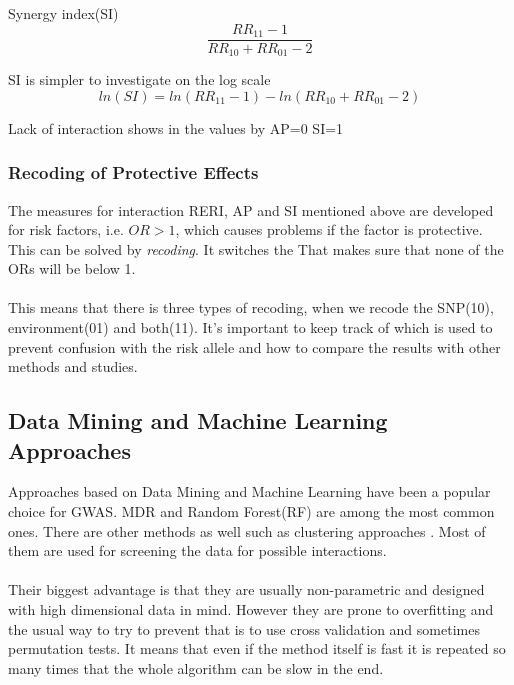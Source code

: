 \documentclass[10pt,a4paper]{report}
\begin{document}
Synergy index(SI)
\begin{equation}
\frac{RR_{11}-1}{RR_{10}+RR_{01}-2}
\end{equation}

SI is simpler to investigate on the log scale
\begin{equation}
ln(SI)=ln(RR_{11}-1)-ln(RR_{10}+RR_{01}-2)
\end{equation}

Lack of interaction shows in the values by
AP=0
SI=1
\cite{recoding_2011}

\subsubsection{Recoding of Protective Effects}
The measures for interaction RERI, AP and SI mentioned above are developed for risk factors, i.e. $OR>1$, which causes problems if the factor is protective. This can be solved by \emph{recoding}. It switches the %
That makes sure that none of the ORs will be below 1.\\
\\
This means that there is three types of recoding, when we recode the SNP(10), environment(01) and both(11). It's important to keep track of which is used to prevent confusion with the risk allele and how to compare the results with other methods and studies.

\cite{recoding_2011}

\subsection{Data Mining and Machine Learning Approaches}
\label{data_machine_learning}
Approaches based on Data Mining and Machine Learning have been a popular choice for GWAS. MDR\cite{mdr_2001} and Random Forest(RF)\cite{random_forest} are among the most common ones\cite{gene_enviroment_2013,cordell_detect_review}. There are other methods as well such as clustering approaches \cite{fast_high_order_cluster}. Most of them are used for screening the data for possible interactions\cite{gene_enviroment_2013,cordell_detect_review}.\\
\\
Their biggest advantage is that they are usually non-parametric and designed with high dimensional data in mind. However they are prone to overfitting and the usual way to try to prevent that is to use cross validation and sometimes permutation tests. It means that even if the method itself is fast it is repeated so many times that the whole algorithm can be slow in the end.\cite{cordell_detect_review}
\end{document}
